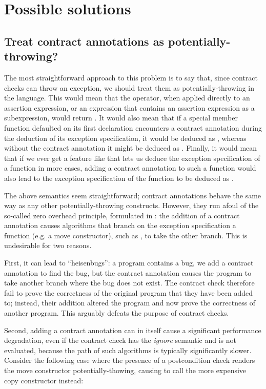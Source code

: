 \section{Possible solutions}

\subsection{Treat contract annotations as potentially-throwing?}

The most straightforward approach to this problem is to say that, since contract checks can throw an exception, we should treat them as potentially-throwing in the language. This would mean that the  operator, when applied directly to an assertion expression, or an expression that contains an assertion expression as a subexpression, would return . It would also mean that if a special member function defaulted on its first declaration encounters a contract annotation during the deduction of its exception specification, it would be deduced as , whereas without the contract annotation it might be deduced as . Finally, it would mean that if we ever get a feature like  that lets us deduce the exception specification of a function in more cases, adding a contract annotation to such a function would also lead to the exception specification of the function to be deduced as .

The above semantics seem straightforward; contract annotations behave the same way as any other potentially-throwing constructs. However, they run afoul of the so-called zero overhead principle, formulated in \cite{P2932R1}: the addition of a contract annotation causes algorithms that branch on the exception specification a function (e.g. a move constructor), such as \mbox{}, to take the other branch. This is undesirable for two reasons.

First, it can lead to ``heisenbugs'': a program contains a bug, we add a contract annotation to find the bug, but the contract annotation causes the program to take another branch where the bug does not exist. The contract check therefore fail to prove the correctness of the original program that they have been added to; instead, their addition altered the program and now prove the correctness of another program. This arguably defeats the purpose of contract checks.

Second, adding a contract annotation can in itself cause a significant performance degradation, even if the contract check has the \emph{ignore} semantic and is not evaluated, because the  path of such algorithms is typically significantly slower. Consider the following case where the presence of a postcondition check renders the move constructor potentially-thowing, causing  to call the more expensive copy constructor instead:

